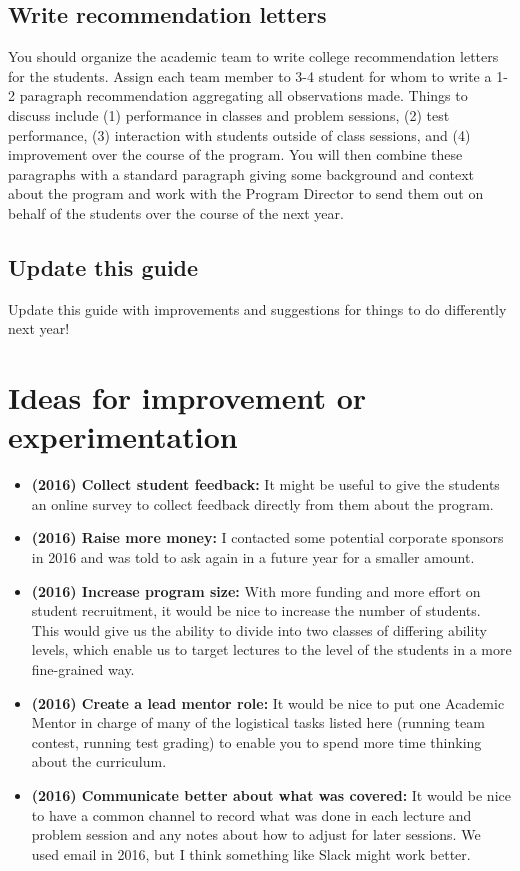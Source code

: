 \documentclass[10pt]{amsart}
\begin{document}
\subsection{Write recommendation letters}

You should organize the academic team to write college recommendation letters for the students.  Assign each team member to 3-4 student for whom to write a 1-2 paragraph recommendation aggregating all observations made.  Things to discuss include (1) performance in classes and problem sessions, (2) test performance, (3) interaction with students outside of class sessions, and (4) improvement over the course of the program.  You will then combine these paragraphs with a standard paragraph giving some background and context about the program and work with the Program Director to send them out on behalf of the students over the course of the next year.

\subsection{Update this guide}

Update this guide with improvements and suggestions for things to do differently next year!

\section{Ideas for improvement or experimentation}

\begin{itemize}
\item \textbf{(2016) Collect student feedback:}  It might be useful to give the students an online survey to collect feedback directly from them about the program.

\item \textbf{(2016) Raise more money:} I contacted some potential corporate sponsors in 2016 and was told to ask again in a future year for a smaller amount.

\item \textbf{(2016) Increase program size:} With more funding and more effort on student recruitment, it would be nice to increase the number of students.  This would give us the ability to divide into two classes of differing ability levels, which enable us to target lectures to the level of the students in a more fine-grained way.

\item \textbf{(2016) Create a lead mentor role:} It would be nice to put one Academic Mentor in charge of many of the logistical tasks listed here (running team contest, running test grading) to enable you to spend more time thinking about the curriculum.

\item \textbf{(2016) Communicate better about what was covered:}  It would be nice to have a common channel to record what was done in each lecture and problem session and any notes about how to adjust for later sessions.  We used email in 2016, but I think something like Slack might work better.
\end{itemize}
\end{document}
